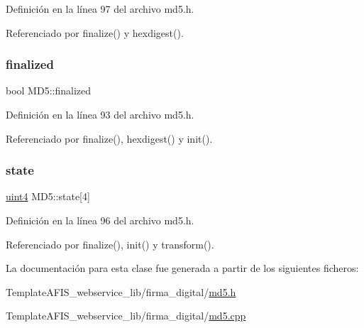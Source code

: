 Definición en la línea 97 del archivo md5.\+h.



Referenciado por finalize() y hexdigest().

\hypertarget{classMD5_a696e995f7045cf0146a207c720386f9c}{}\label{classMD5_a696e995f7045cf0146a207c720386f9c} 
\subsubsection{\texorpdfstring{finalized}{finalized}}
{\footnotesize\ttfamily bool M\+D5\+::finalized\hspace{0.3cm}{\ttfamily [private]}}



Definición en la línea 93 del archivo md5.\+h.



Referenciado por finalize(), hexdigest() y init().

\hypertarget{classMD5_aae3f861952f5b129463f550170836db0}{}\label{classMD5_aae3f861952f5b129463f550170836db0} 
\subsubsection{\texorpdfstring{state}{state}}
{\footnotesize\ttfamily \hyperlink{classMD5_a2e5b84a3d7db292f49873061214a0444}{uint4} M\+D5\+::state\mbox{[}4\mbox{]}\hspace{0.3cm}{\ttfamily [private]}}



Definición en la línea 96 del archivo md5.\+h.



Referenciado por finalize(), init() y transform().



La documentación para esta clase fue generada a partir de los siguientes ficheros\+:\begin{DoxyCompactItemize}
\item 
Template\+A\+F\+I\+S\+\_\+webservice\+\_\+lib/firma\+\_\+digital/\hyperlink{md5_8h}{md5.\+h}\item 
Template\+A\+F\+I\+S\+\_\+webservice\+\_\+lib/firma\+\_\+digital/\hyperlink{md5_8cpp}{md5.\+cpp}\end{DoxyCompactItemize}
